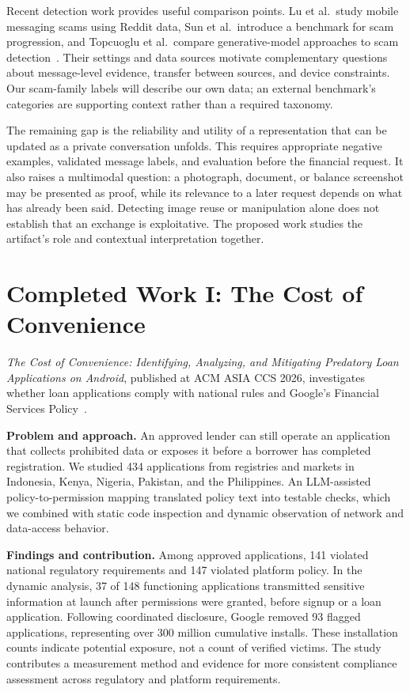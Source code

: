 \documentclass[letterpaper,11pt]{article}
\begin{document}
Recent detection work provides useful comparison points. Lu et al.\ study mobile
messaging scams using Reddit data, Sun et al.\ introduce a benchmark for scam
progression, and Topcuoglu et al.\ compare generative-model approaches to scam
detection~\cite{lu2026readthis,sun2026prescam,topcuoglu2026genai}.
Their settings and data sources motivate complementary questions about
message-level evidence, transfer between sources, and device constraints.
Our scam-family labels will describe our own data; an external benchmark's
categories are supporting context rather than a required taxonomy.

The remaining gap is the reliability and utility of a representation that can
be updated as a private conversation unfolds. This requires appropriate negative
examples, validated message labels, and evaluation before the financial request.
It also raises a multimodal question: a photograph, document, or balance screenshot
may be presented as proof, while its relevance to a later request depends on what
has already been said. Detecting image reuse or manipulation alone does not
establish that an exchange is exploitative. The proposed work studies the
artifact's role and contextual interpretation together.

\section{Completed Work I: The Cost of Convenience}
\label{sec:loanapps}
\emph{The Cost of Convenience: Identifying, Analyzing, and Mitigating Predatory
Loan Applications on Android}, published at ACM ASIA CCS 2026, investigates
whether loan applications comply with national rules and Google's Financial
Services Policy~\cite{akanji2026cost}.

\textbf{Problem and approach.} An approved lender can still operate an
application that collects prohibited data or exposes it before a borrower has
completed registration. We studied 434 applications from registries and markets
in Indonesia, Kenya, Nigeria, Pakistan, and the Philippines. An LLM-assisted
policy-to-permission mapping translated policy text into testable checks, which
we combined with static code inspection and dynamic observation of network and
data-access behavior.

\textbf{Findings and contribution.} Among approved applications, 141 violated
national regulatory requirements and 147 violated platform policy. In the dynamic
analysis, 37 of 148 functioning applications transmitted sensitive information
at launch after permissions were granted, before signup or a loan application.
Following coordinated disclosure, Google removed 93 flagged applications,
representing over 300 million cumulative installs. These installation counts
indicate potential exposure, not a count of verified victims. The study
contributes a measurement method and evidence for more consistent compliance
assessment across regulatory and platform requirements.
\end{document}
